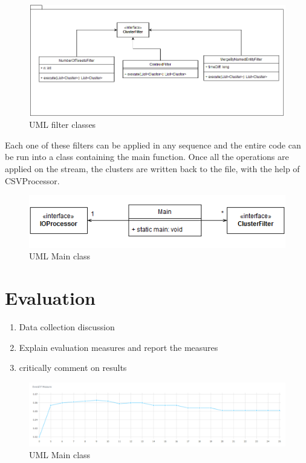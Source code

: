 \documentclass[a4paper,portrait,12pt]{article}
\begin{document}
\begin{figure}[h!]
    \centering
    \includegraphics[width=0.7\linewidth]{images/filterUML.png}
  \caption{UML filter classes}
  \label{fig:filterUML}
\end{figure}

Each one of these filters can be applied in any sequence and the entire code can be run into a class containing the main function.
Once all the operations are applied on the stream, the clusters are written back to the file, with the help of CSVProcessor.

\begin{figure}[h!]
    \centering
    \includegraphics[width=0.7\linewidth]{images/mainUML.png}
  \caption{UML Main class}
  \label{fig:mainUML}
\end{figure}

\section{Evaluation}
\begin{enumerate}
    \item Data collection discussion
    \item Explain evaluation measures and report the measures
    \item critically comment on results
\end{enumerate}

\begin{figure}[h!]
    \centering
    \includegraphics[width=\linewidth]{images/1day-filtered-f-measure.png}
  \caption{UML Main class}
  \label{fig:mainUML}
\end{figure}
\end{document}

